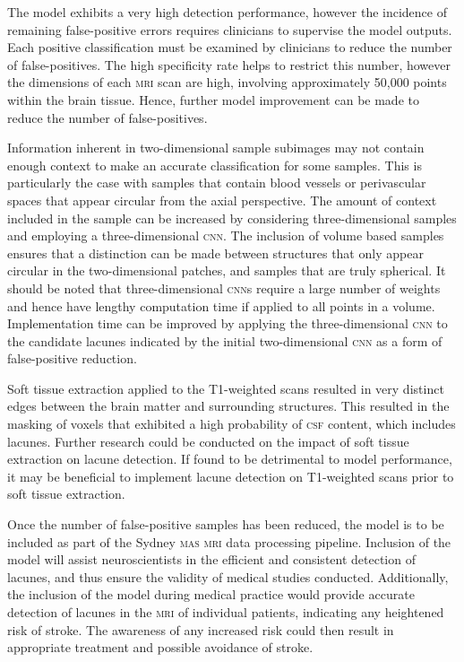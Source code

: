 The model exhibits a very high detection performance, however the incidence of remaining false-positive errors requires clinicians to supervise the model outputs. Each positive classification must be examined by clinicians to reduce the number of false-positives. The high specificity rate helps to restrict this number, however the dimensions of each \textsc{mri} scan are high, involving approximately 50,000 points within the brain tissue. Hence, further model improvement can be made to reduce the number of false-positives.

Information inherent in two-dimensional sample subimages may not contain enough context to make an accurate classification for some samples. This is particularly the case with samples that contain blood vessels or perivascular spaces that appear circular from the axial perspective. The amount of context included in the sample can be increased by considering three-dimensional samples and employing a three-dimensional \textsc{cnn}. The inclusion of volume based samples ensures that a distinction can be made between structures that only appear circular in the two-dimensional patches, and samples that are truly spherical. It should be noted that three-dimensional \textsc{cnn}s require a large number of weights and hence have lengthy computation time if applied to all points in a volume. Implementation time can be improved by applying the three-dimensional \textsc{cnn} to the candidate lacunes indicated by the initial two-dimensional \textsc{cnn} as a form of false-positive reduction.

Soft tissue extraction applied to the T1-weighted scans resulted in very distinct edges between the brain matter and surrounding structures. This resulted in the masking of voxels that exhibited a high probability of \textsc{csf} content, which includes lacunes. Further research could be conducted on the impact of soft tissue extraction on lacune detection. If found to be detrimental to model performance, it may be beneficial to implement lacune detection on T1-weighted scans prior to soft tissue extraction.

Once the number of false-positive samples has been reduced, the model is to be included as part of the Sydney \textsc{mas} \textsc{mri} data processing pipeline. Inclusion of the model will assist neuroscientists in the efficient and consistent detection of lacunes, and thus ensure the validity of medical studies conducted. Additionally, the inclusion of the model during medical practice would provide accurate detection of lacunes in the \textsc{mri} of individual patients, indicating any heightened risk of stroke. The awareness of any increased risk could then result in appropriate treatment and possible avoidance of stroke.

